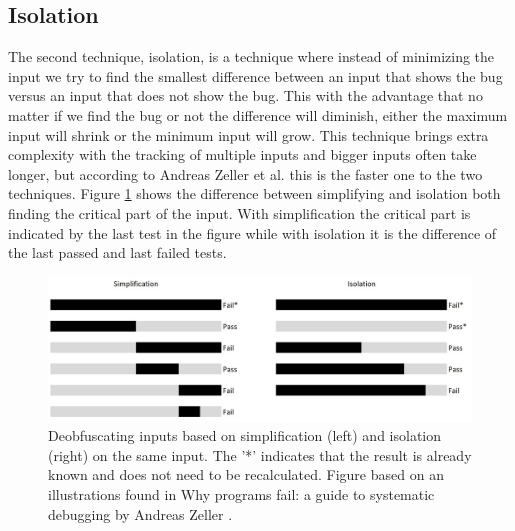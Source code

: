 \subsection{Isolation}
\label{cha:3:Isolation}
The second technique, isolation, is a technique where instead of minimizing the input we try to find the smallest difference between an input that shows the bug versus an input that does not show the bug. This with the advantage that no matter if we find the bug or not the difference will diminish, either the maximum input will shrink or the minimum input will grow. 
This technique brings extra complexity with the tracking of multiple inputs and bigger inputs often take longer, but according to Andreas Zeller et al. \cite{5zeller2002simplifyingIsolatingFailure-inducing} this is the faster one to the two techniques. 
Figure \ref{fig:simplificationIsolation} shows the difference between simplifying and isolation both finding the critical part of the input. With simplification the critical part is indicated by the last test in the figure while with isolation it is the difference of the last passed and last failed tests.
\begin{figure}
	\centering
	\includegraphics[width=1.0\textwidth]{images/simplificationIsolation}
	\caption{Deobfuscating inputs based on simplification (left) and isolation (right) on the same input. The '*' indicates that the result is already known and does not need to be recalculated. Figure based on an illustrations found in Why programs fail: a guide to systematic debugging by Andreas Zeller \cite{bookZellerwhyProgramsFail}.}
	\label{fig:simplificationIsolation}
\end{figure}

